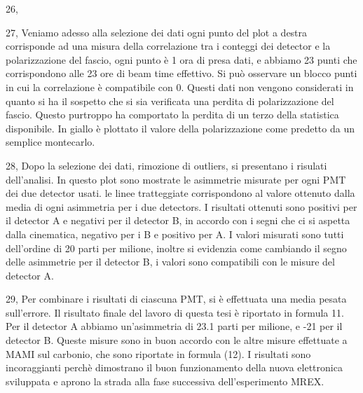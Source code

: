 \documentclass[11pt,a4paper]{article}
\begin{document}
\begin{list}{\textbf{slide}}{}
\item 26,

\item 27, Veniamo adesso alla selezione dei dati
ogni punto del plot a destra corrisponde ad una misura della correlazione tra i conteggi dei detector e la polarizzazione del fascio, ogni punto è 1 ora di presa dati, e abbiamo 23 punti che corrispondono alle 23 ore di beam time effettivo. Si può osservare un blocco punti in cui la correlazione è compatibile con 0. Questi dati non vengono considerati in quanto si ha il sospetto che si sia verificata una perdita di polarizzazione del fascio. Questo purtroppo ha comportato la perdita di un terzo della statistica disponibile. In giallo è plottato il valore della polarizzazione come predetto da un semplice montecarlo.

\item 28, Dopo la selezione dei dati, rimozione di outliers, si presentano i risulati dell'analisi. In questo plot sono mostrate le asimmetrie misurate per ogni PMT dei due detector usati. le linee tratteggiate corrispondono al valore ottenuto dalla media di ogni asimmetria per i due detectors. I risultati ottenuti sono positivi per il detector A e negativi per il detector B, in accordo con i segni che ci si aspetta dalla cinematica, negativo per i B e positivo per A. I valori misurati sono tutti dell'ordine di 20 parti per milione, inoltre si evidenzia come cambiando il segno delle asimmetrie per il detector B, i valori sono compatibili con le misure del detector A. 

\item 29, Per combinare i risultati di ciascuna PMT, si è effettuata una media pesata sull'errore. Il risultato finale del lavoro di questa tesi è riportato in formula 11. Per il detector A abbiamo un'asimmetria di 23.1 parti per milione, e -21 per il detector B. Queste misure sono in buon accordo con le altre misure effettuate a MAMI sul carbonio, che sono riportate in formula (12). I risultati sono incoraggianti perchè dimostrano il buon funzionamento della nuova elettronica sviluppata e aprono la strada alla fase successiva dell'esperimento MREX. 
\end{list}
\end{document}
